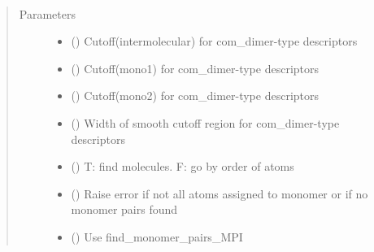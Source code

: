 \documentclass[letterpaper,10pt,english]{sphinxmanual}
\begin{document}

\begin{fulllineitems}
\label{\detokenize{descriptors:gap.descriptors.com_dimer}}~\begin{quote}\begin{description}
\item[{Parameters}] \leavevmode\begin{itemize}
\item {} 
 () \textendash{} Cutoff(intermolecular) for com\_dimer-type descriptors

\item {} 
 () \textendash{} Cutoff(mono1) for com\_dimer-type descriptors

\item {} 
 () \textendash{} Cutoff(mono2) for com\_dimer-type descriptors

\item {} 
 () \textendash{} Width of smooth cutoff region for com\_dimer-type descriptors

\item {} 
 () \textendash{} T: find molecules. F: go by order of atoms

\item {} 
 () \textendash{} Raise error if not all atoms assigned to monomer or if no monomer pairs found

\item {} 
 () \textendash{} Use find\_monomer\_pairs\_MPI


\end{itemize}
\end{description}
\end{quote}
\end{fulllineitems}
\end{document}
